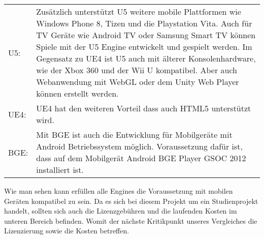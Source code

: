 \begin{table}[H]
\centering
\renewcommand{\arraystretch}{1.5}
\begin{tabular}{lp{14.5cm}}
\ac{U5}:  & Zusätzlich unterstützt \ac{U5} weitere mobile Plattformen wie Windows Phone 8, Tizen und die Playstation Vita. Auch für TV Geräte wie Android TV oder Samsung Smart TV können Spiele mit der \ac{U5} Engine entwickelt und gespielt werden. Im Gegensatz zu \ac{UE4} ist \ac{U5} auch mit älterer Konsolenhardware, wie der Xbox 360 und der Wii U kompatibel. Aber auch Webanwendung mit WebGL oder dem Unity Web Player können erstellt werden. \\

\ac{UE4}: & \ac{UE4} hat den weiteren Vorteil dass auch HTML5 unterstützt wird. \\

\ac{BGE}:     & Mit \ac{BGE} ist auch die Entwicklung für Mobilgeräte mit Android Betriebssystem möglich. Voraussetzung dafür ist, dass auf dem Mobilgerät Android \ac{BGE} Player GSOC 2012 installiert ist. 
\end{tabular}
\end{table}

Wie man sehen kann erfüllen alle Engines die Voraussetzung mit mobilen Geräten kompatibel zu sein. Da es sich bei diesem Projekt um ein Studienprojekt handelt, sollten sich auch die Lizenzgebühren und die laufenden Kosten im unteren Bereich befinden. Womit der nächste Kritikpunkt unseres Vergleiches die Lizenzierung sowie die Kosten betreffen.


\newpage

